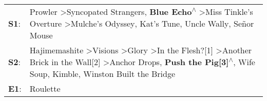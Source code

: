 \begin{supertabular}{p{0.03\textwidth}p{0.92\textwidth}}
 \textbf{S1}:  &                                                                                                                 Prowler\textsuperscript{} \textgreater \enspace Syncopated Strangers\textsuperscript{}, \enspace \textbf{Blue Echo\textsuperscript{$\wedge$}} \textgreater \enspace Miss Tinkle's Overture\textsuperscript{} \textgreater \enspace Mulche's Odyssey\textsuperscript{}, \enspace Kat's Tune\textsuperscript{}, \enspace Uncle Wally\textsuperscript{}, \enspace Señor Mouse\textsuperscript{}  \enspace  \\
 \textbf{S2}:  &  Hajimemashite\textsuperscript{} \textgreater \enspace Visions\textsuperscript{} \textgreater \enspace Glory\textsuperscript{} \textgreater \enspace In the Flesh?[1]\textsuperscript{} \textgreater \enspace Another Brick in the Wall[2]\textsuperscript{} \textgreater \enspace Anchor Drops\textsuperscript{}, \enspace \textbf{Push the Pig[3]\textsuperscript{$\wedge$}}, \enspace Wife Soup\textsuperscript{}, \enspace Kimble\textsuperscript{}, \enspace Winston Built the Bridge\textsuperscript{}  \enspace  \\
 \textbf{E1}:  &                                                                                                                                                                                                                                                                                                                                                                                                                                                                                   Roulette\textsuperscript{}  \enspace  \\
\end{supertabular}
